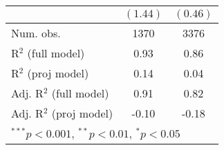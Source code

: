 \documentclass[12pt]{article}
\begin{document}
\begin{table}
\begin{center}
\begin{tabular}{l c c }
			& $(1.44)$     & $(0.46)$     \\
			\hline
			Num. obs.               & 1370         & 3376         \\
			R$^2$ (full model)      & 0.93         & 0.86         \\
			R$^2$ (proj model)      & 0.14         & 0.04         \\
			Adj. R$^2$ (full model) & 0.91         & 0.82         \\
			Adj. R$^2$ (proj model) & -0.10        & -0.18        \\
			\hline
			\multicolumn{3}{l}{\scriptsize{$^{***}p<0.001$, $^{**}p<0.01$, $^*p<0.05$}}
		\end{tabular}
	\end{center}
\end{table}	
\end{document}
